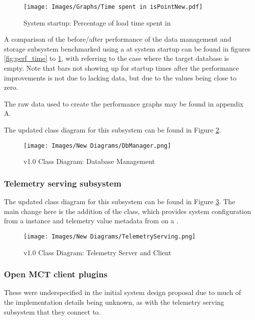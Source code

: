 \begin{figure}[ht]
  \centering
  \texttt{[image: Images/Graphs/Time spent in isPointNew.pdf]}
  \caption{System startup: Percentage of load time spent in }
  \label{fig:perf_percentage}
\end{figure}

A comparison of the before/after performance of the data management and storage subsystem benchmarked using a  at system startup can be found in figures \ref{fig:perf_time} to \ref{fig:perf_percentage}, with  referring to the case where the target database is empty. Note that bars not showing up for startup times after the performance improvements is not due to lacking data, but due to the values being close to zero.

The raw data used to create the performance graphs may be found in appendix A.

The updated class diagram for this subsystem can be found in Figure \ref{fig:new_cddb}.

\begin{figure}[H]
  \centering
  \texttt{[image: Images/New Diagrams/DbManager.png]}
  \caption{v1.0 Class Diagram: Database Management}
  \label{fig:new_cddb}
\end{figure}

\subsubsection{Telemetry serving subsystem}
The updated class diagram for this subsystem can be found in Figure \ref{fig:new_cdserving}. The main change here is the addition of the  class, which provides system configuration from a  instance and telemetry value \gls{metadata} from  on a .

\begin{figure}[H]
  \centering
  \texttt{[image: Images/New Diagrams/TelemetryServing.png]}
  \caption{v1.0 Class Diagram: Telemetry Server and Client}
  \label{fig:new_cdserving}
\end{figure}

\subsubsection{Open MCT client plugins}
These were underspecified in the initial system design proposal due to much of the implementation details being unknown, as with the telemetry serving subsystem that they connect to.

